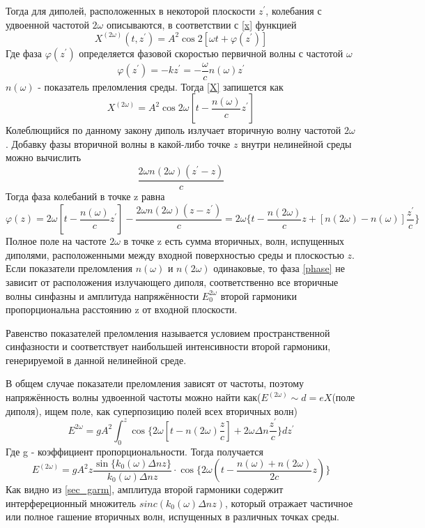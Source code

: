 \documentclass[a4paper,12pt]{article} %
\begin{document}
Тогда для диполей, расположенных в некоторой плоскости $z^{'}$, колебания с удвоенной частотой $2\omega$ описываются, в соответствии с \eqref{x} функцией
\begin{equation}
X^{(2\omega)}(t, z^{'}) = A^2 \cos 2 \left[ \omega t + \varphi (z^{'}) \right]
\label{X}
\end{equation}
Где фаза $\varphi(z^{'})$ определяется фазовой скоростью первичной волны с частотой $\omega$
\begin{equation}
\varphi(z^{'}) = - k z^{'} = - \frac{\omega}{c} n(\omega) z^{'}
\end{equation}
$n(\omega)$ - показатель преломления среды. Тогда \eqref{X} запишется как
\begin{equation}
X^{(2\omega)} = A^2 \cos 2 \omega \left[t - \frac{n(\omega)}{c} z^{'} \right]
\end{equation}
Колеблющийся по данному закону диполь излучает вторичную волну частотой $2\omega$. Добавку фазы вторичной волны в какой-либо точке $z$ внутри нелинейной среды можно вычислить
\begin{equation}
\frac{2 \omega n(2\omega) (z^{'} - z)}{c}
\end{equation}
Тогда фаза колебаний в точке z равна
\begin{equation}
\varphi(z) = 2 \omega \left[ t - \frac{n(\omega)}{c} z^{'} \right] - \frac{2 \omega n(2\omega)(z-z^{'})}{c} = 2 \omega \{ t - \frac{n(2\omega)}{c} z + \left[ n(2\omega) - n(\omega) \right] \frac{z^{'}}{c} \}
\label{phase}
\end{equation}
Полное поле на частоте $2\omega$ в точке z есть сумма вторичных, волн, испущенных диполями, расположенными между входной поверхностью среды и плоскостью $z$. Если показатели преломления $n(\omega)$ и $n(2\omega)$ одинаковые, то фаза \eqref{phase} не зависит от расположения излучающего диполя, соответственно все вторичные волны синфазны и амплитуда напряжённости $E^{2\omega}_0$ второй гармоники пропорциональна расстоянию z от входной плоскости.

Равенство показателей преломления называется условием пространственной синфазности и соответствует наибольшей интенсивности второй гармоники, генерируемой в данной нелинейной среде. 

В общем случае показатели преломления зависят от частоты, поэтому напряжённость волны удвоенной частоты можно найти как($E^{(2\omega)} \sim d = eX$(поле диполя), ищем поле, как суперпозицию полей всех вторичных волн)
\begin{equation}
E^{2\omega} = gA^2 \int^z_0 \cos \{ 2\omega \left[ t - n(2\omega) \frac{z}{c} \right] + 2 \omega \Delta n \frac{z^{'}}{c} \} dz^{'}
\end{equation}
Где g - коэффициент пропорциональности. Тогда получается
\begin{equation}
E^{(2\omega)} = gA^2 z \frac{\sin \{k_0(\omega) \Delta n z \}}{k_0(\omega) \Delta n z} \cdot \cos \{2\omega\left( t - \frac{n(\omega) + n(2\omega)}{2c}z \right) \}
\label{sec_garm}
\end{equation}  
Как видно из \eqref{sec_garm}, амплитуда второй гармоники содержит интерфереционный множитель $sinc \left( k_0(\omega) \Delta n z \right)$, который отражает частичное или полное гашение вторичных волн, испущенных в различных точках среды.
\end{document}

